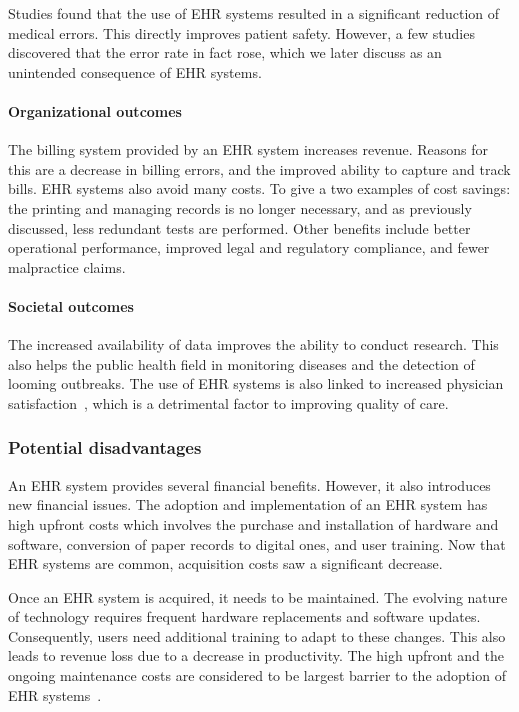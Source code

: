         Studies found that the use of EHR systems resulted in a significant reduction of medical errors. This directly improves patient safety. However, a few studies discovered that the error rate in fact rose, which we later discuss as an unintended consequence of EHR systems.

        \paragraph{Organizational outcomes} The billing system provided by an EHR system increases revenue. Reasons for this are a decrease in billing errors, and the improved ability to capture and track bills. EHR systems also avoid many costs. To give a two examples of cost savings: the printing and managing records is no longer necessary, and as previously discussed, less redundant tests are performed. Other benefits include better operational performance, improved legal and regulatory compliance, and fewer malpractice claims.

        \paragraph{Societal outcomes} The increased availability of data improves the ability to conduct research. This also helps the public health field in monitoring diseases and the detection of looming outbreaks. The use of EHR systems is also linked to increased physician satisfaction~\cite{Menachemi2009}, which is a detrimental factor to improving quality of care.

        \subsubsection{Potential disadvantages}\label{ehrs_disadvantages}

        An EHR system provides several financial benefits. However, it also introduces new financial issues. The adoption and implementation of an EHR system has high upfront costs which involves the purchase and installation of hardware and software, conversion of paper records to digital ones, and user training. Now that EHR systems are common, acquisition costs saw a significant decrease.

        Once an EHR system is acquired, it needs to be maintained. The evolving nature of technology requires frequent hardware replacements and software updates. Consequently, users need additional training to adapt to these changes. This also leads to revenue loss due to a decrease in productivity. The high upfront and the ongoing maintenance costs are considered to be largest barrier to the adoption of EHR systems~\cite{Menachemi2006}.


